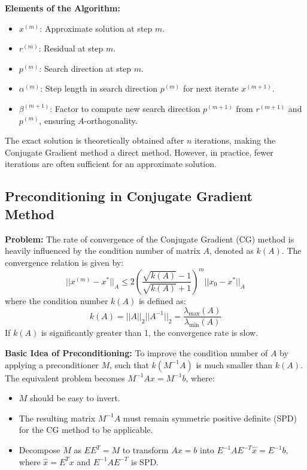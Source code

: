 \documentclass[unicode,11pt,a4paper,oneside,numbers=endperiod,openany]{scrartcl}
\begin{document}
\textbf{Elements of the Algorithm:}
\begin{itemize}
    \item \( x^{(m)} \): Approximate solution at step \( m \).
    \item \( r^{(m)} \): Residual at step \( m \).
    \item \( p^{(m)} \): Search direction at step \( m \).
    \item \( \alpha^{(m)} \): Step length in search direction \( p^{(m)} \) for next iterate \( x^{(m+1)} \).
    \item \( \beta^{(m+1)} \): Factor to compute new search direction \( p^{(m+1)} \) from \( r^{(m+1)} \) and \( p^{(m)} \), ensuring \( A \)-orthogonality.
\end{itemize}

The exact solution is theoretically obtained after \( n \) iterations, making the Conjugate Gradient method a direct method. However, in practice, fewer iterations are often sufficient for an approximate solution.

\subsection{Preconditioning in Conjugate Gradient Method}

\textbf{Problem:}
The rate of convergence of the Conjugate Gradient (CG) method is heavily influenced by the condition number of matrix \( A \), denoted as \( k(A) \). The convergence relation is given by:
\[
||x^{(m)} - x^*||_A \leq 2 \left( \frac{\sqrt{k(A)} - 1}{\sqrt{k(A)} + 1} \right)^m ||x_0 - x^*||_A
\]
where the condition number \( k(A) \) is defined as:
\[
k(A) = ||A||_2 ||A^{-1}||_2 = \frac{\lambda_{\text{max}}(A)}{\lambda_{\text{min}}(A)}
\]
If \( k(A) \) is significantly greater than 1, the convergence rate is slow.

\textbf{Basic Idea of Preconditioning:}
To improve the condition number of \( A \) by applying a preconditioner \( M \), such that \( k(M^{-1}A) \) is much smaller than \( k(A) \). The equivalent problem becomes \( M^{-1}Ax = M^{-1}b \), where:
\begin{itemize}
    \item \( M \) should be easy to invert.
    \item The resulting matrix \( M^{-1}A \) must remain symmetric positive definite (SPD) for the CG method to be applicable.
    \item Decompose \( M \) as \( EE^T = M \) to transform \( Ax = b \) into \( E^{-1}AE^{-T}\hat{x} = E^{-1}b \), where \( \hat{x} = E^Tx \) and \( E^{-1}AE^{-T} \) is SPD.
\end{itemize}
\end{document}
